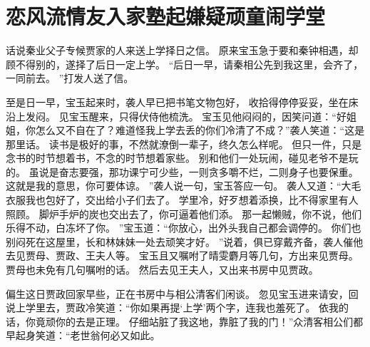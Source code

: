 \chapter{恋风流情友入家塾\quad 起嫌疑顽童闹学堂}
\par
话说秦业父子专候贾家的人来送上学择日之信。
原来宝玉急于要和秦钟相遇，却顾不得别的，遂择了后日一定上学。
“后日一早，请秦相公先到我这里，会齐了，一同前去。
”打发人送了信。
\par
至是日一早，宝玉起来时，袭人早已把书笔文物包好，
收拾得停停妥妥，坐在床沿上发闷。
见宝玉醒来，只得伏侍他梳洗。
宝玉见他闷闷的，因笑问道：“好姐姐，你怎么又不自在了？难道怪我上学去丢的你们冷清了不成？”袭人笑道：“这是那里话。
读书是极好的事，不然就潦倒一辈子，终久怎么样呢。
但只一件，只是念书的时节想着书，不念的时节想着家些。
别和他们一处玩闹，碰见老爷不是玩的。
虽说是奋志要强，那功课宁可少些，一则贪多嚼不烂，二则身子也要保重。
这就是我的意思，你可要体谅。
”袭人说一句，宝玉答应一句。
袭人又道：“大毛衣服我也包好了，交出给小子们去了。
学里冷，好歹想着添换，比不得家里有人照顾。
脚炉手炉的炭也交出去了，你可逼着他们添。
那一起懒贼，你不说，他们乐得不动，白冻坏了你。
”宝玉道：“你放心，出外头我自己都会调停的。
你们也别闷死在这屋里，长和林妹妹一处去顽笑才好。
”说着，俱已穿戴齐备，袭人催他去见贾母、贾政、王夫人等。
宝玉且又嘱咐了晴雯麝月等几句，方出来见贾母。
贾母也未免有几句嘱咐的话。
然后去见王夫人，又出来书房中见贾政。
\par
偏生这日贾政回家早些，正在书房中与相公清客们闲谈。
忽见宝玉进来请安，回说上学里去，贾政冷笑道：“你如果再提‘上学’两个字，连我也羞死了。
依我的话，你竟顽你的去是正理。
仔细站脏了我这地，靠脏了我的门！”众清客相公们都早起身笑道：“老世翁何必又如此。
